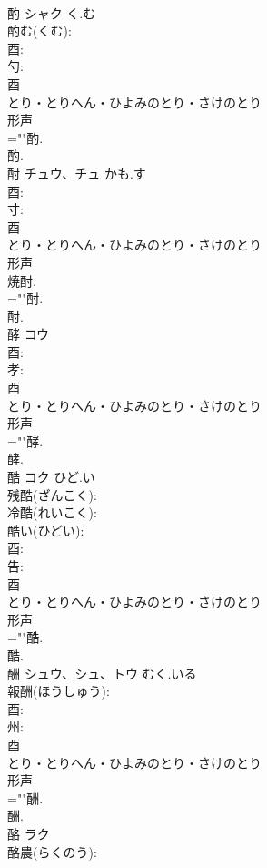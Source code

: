\documentclass[8pt]{extreport}
\begin{document}
\begin{CJK}{UTF8}{min}
\\	酌	シャク	く.む		
\\	酌む(くむ): 
\\	酉: 
\\	勺: 
\\	酉	
\\	とり・とりへん・ひよみのとり・さけのとり	
\\	形声 
\\	=""酌.
\\	酌.
\\	酎	チュウ、チュ	かも.す		
\\	酉: 
\\	寸: 
\\	酉	
\\	とり・とりへん・ひよみのとり・さけのとり	
\\	形声 
\\	焼酎. 
\\	=""酎.
\\	酎.
\\	酵	コウ			
\\	酉: 
\\	孝: 
\\	酉	
\\	とり・とりへん・ひよみのとり・さけのとり	
\\	形声 
\\	=""酵.
\\	酵.
\\	酷	コク	ひど.い		
\\	残酷(ざんこく): 
\\	冷酷(れいこく): 
\\	酷い(ひどい): 
\\	酉: 
\\	告: 
\\	酉	
\\	とり・とりへん・ひよみのとり・さけのとり	
\\	形声 
\\	=""酷.
\\	酷.
\\	酬	シュウ、シュ、トウ	むく.いる		
\\	報酬(ほうしゅう): 
\\	酉: 
\\	州: 
\\	酉	
\\	とり・とりへん・ひよみのとり・さけのとり	
\\	形声 
\\	=""酬.
\\	酬.
\\	酪	ラク			
\\	酪農(らくのう): 

\end{CJK}
\end{document}
